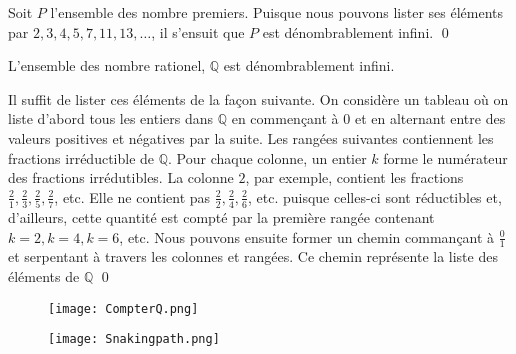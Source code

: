 \documentclass[16pt]{report}
\begin{document}
\begin{multicols*}{2}
            \begin{EExample}{}{}
                Soit $P$ l'ensemble des nombre premiers. Puisque nous pouvons lister ses éléments par 
                $2, 3, 4, 5, 7, 11, 13, \dots$, il s'ensuit que $P$ est dénombrablement infini. \qed 
            \end{EExample}


            \begin{Theoremcon}{}
                L'ensemble des nombre rationel, $\mathbb{Q}$ est dénombrablement infini. 
            \end{Theoremcon}


            \begin{Preuve}{}{}
                Il suffit de lister ces éléments de la façon suivante. On considère un tableau où on liste 
                d'abord tous les entiers dans $\mathbb{Q}$ en commençant à 0 et en alternant entre des valeurs 
                positives et négatives par la suite. Les rangées suivantes contiennent les fractions irréductible 
                de $\mathbb{Q}$. Pour chaque colonne, un entier $k$ forme le numérateur des fractions 
                irrédutibles. La colonne $2$, par exemple, contient les fractions 
                $\frac{2}{1}, \frac{2}{3}, \frac{2}{5}, \frac{2}{7}$, etc. Elle ne contient pas 
                $\frac{2}{2}, \frac{2}{4}, \frac{2}{6}$, etc. puisque celles-ci sont réductibles et, d'ailleurs, 
                cette quantité est compté par la première rangée contenant $k = 2, k = 4, k = 6$, etc. 
                Nous pouvons ensuite former un chemin commançant à $\frac{0}{1}$ et serpentant à travers les 
                colonnes et rangées. Ce chemin représente la liste des éléments de $\mathbb{Q}$ \qed
            \end{Preuve}


            \begin{figure}[H]
                \begin{center}
                    \texttt{[image: CompterQ.png]}
                \end{center}
            \end{figure}
            


            \begin{figure}[H]
                \begin{center}
                    \texttt{[image: Snakingpath.png]}
                \end{center}
            \end{figure}


\end{multicols*}
\end{document}
